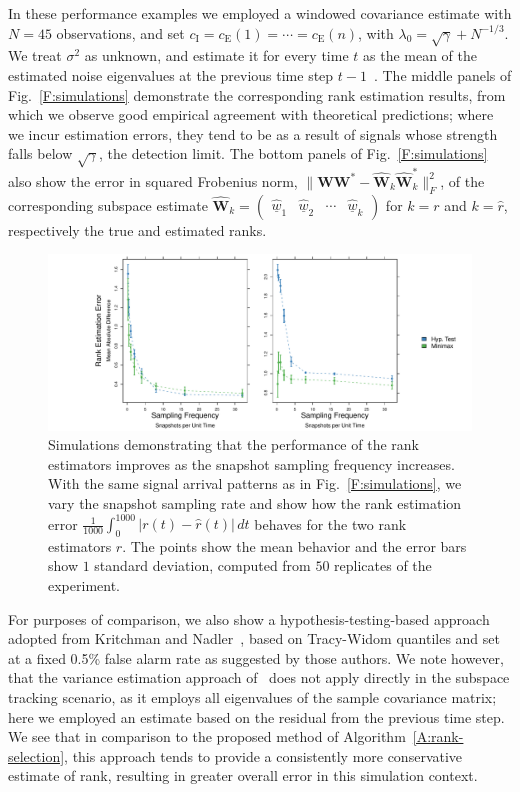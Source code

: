 \documentclass[final]{IEEEtran}
\newcommand{\vectorsymbol}{\underline}
\newcommand{\matrixsymbol}{\boldsymbol}
\newcommand{\mW}{\matrixsymbol{W}}
\newcommand{\mhW}{\widehat{\matrixsymbol{W}}}
\newcommand{\vhw}{\hat{\vectorsymbol{w}}}
\newcommand{\ce}{c_\text{E}}
\newcommand{\ci}{c_\text{I}}
\begin{document}
In these performance examples we employed a windowed covariance estimate with $N = 45$ observations, and set $\ci = \ce(1) = \cdots = \ce(n)$, with $\lambda_0 = \sqrt{\gamma} + N^{-1/3}$.  We treat $\sigma^2$ as unknown, and estimate it for every time $t$ as the mean of the estimated noise eigenvalues at the previous time step $t-1$~\cite{rabideau1996fra}.  The middle panels of Fig.~\ref{F:simulations} demonstrate the corresponding rank estimation results, from which we observe good empirical agreement with theoretical predictions; where we incur estimation errors, they tend to be as a result of signals whose strength falls below $\sqrt{\gamma}$, the detection limit.  The bottom panels of Fig.~\ref{F:simulations} also show the error in squared Frobenius norm, $\| \mW \mW^\ast - \mhW_k \mhW^\ast_k \|_F^2$, of the corresponding subspace estimate
\(
    \mhW_k
    =
    \begin{pmatrix}
        \vhw_1 & \vhw_2 & \cdots & \vhw_k
    \end{pmatrix}
\)
for $k = r$ and $k = \hat r$, respectively the true and estimated ranks.

\begin{figure}
    \centering
    \includegraphics[width=2.1\columnwidth]{plots/consistency-sim}
    \caption{Simulations demonstrating that the performance of the rank estimators improves as the snapshot sampling frequency increases.  With the same signal arrival patterns as in Fig.~\ref{F:simulations}, we vary the snapshot sampling rate and show how the rank estimation error $\frac{1}{1000} \int_0^{1000} |r(t) - \hat r(t)| \, dt$ behaves for the two rank estimators $\hat r$.  The points show the mean behavior and the error bars show $1$ standard deviation, computed from $50$ replicates of the experiment.}\label{F:consistency-sim}
  \end{figure}

For purposes of comparison, we also show a hypothesis-testing-based approach adopted from Kritchman and Nadler~\cite{kritchman2008dnc}, based on Tracy-Widom quantiles and set at a fixed 0.5\% false alarm rate as suggested by those authors.  We note however, that the variance estimation approach of~\cite{kritchman2008dnc} does not apply directly in the subspace tracking scenario, as it employs all eigenvalues of the sample covariance matrix; here we employed an estimate based on the residual from the previous time step.  We see that in comparison to the proposed method of Algorithm~\ref{A:rank-selection}, this approach tends to provide a consistently more conservative estimate of rank, resulting in greater overall error in this simulation context.
\end{document}
